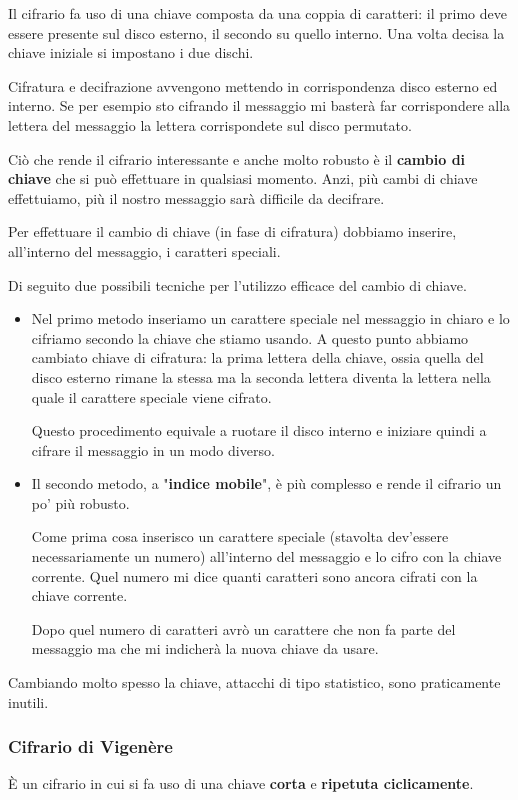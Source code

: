 Il cifrario fa uso di una chiave composta da una coppia di caratteri: il primo deve essere presente sul disco esterno, il
secondo su quello interno. Una volta decisa la chiave iniziale si impostano i due dischi.

Cifratura e decifrazione avvengono mettendo in corrispondenza disco esterno ed interno. Se per esempio sto cifrando il
messaggio mi baster\`a far corrispondere alla lettera del messaggio la lettera corrispondete sul disco permutato.

Ci\`o che rende il cifrario interessante e anche molto robusto \`e il \textbf{cambio di chiave} che si pu\`o effettuare
in qualsiasi momento. Anzi, pi\`u cambi di chiave effettuiamo, pi\`u il nostro messaggio sar\`a difficile da decifrare.

Per effettuare il cambio di chiave (in fase di cifratura) dobbiamo inserire, all'interno del messaggio, i caratteri speciali.

Di seguito due possibili tecniche per l'utilizzo efficace del cambio di chiave.
\begin{itemize}
	\item Nel primo metodo inseriamo un carattere speciale nel messaggio in chiaro e lo cifriamo secondo la chiave che stiamo
	      usando. A questo punto abbiamo cambiato chiave di cifratura: la prima lettera della chiave, ossia quella del disco
	      esterno rimane la stessa ma la seconda lettera diventa la lettera nella quale il carattere speciale viene cifrato.

	      Questo procedimento equivale a ruotare il disco interno e iniziare quindi a cifrare il messaggio in un modo diverso.
	\item Il secondo metodo, a "\textbf{indice mobile}", \`e pi\`u complesso e rende il cifrario un po' pi\`u robusto.

	      Come prima cosa inserisco un carattere speciale (stavolta dev'essere necessariamente un numero) all'interno del
	      messaggio e lo cifro con la chiave corrente. Quel numero mi dice quanti caratteri sono ancora cifrati con la chiave
	      corrente.

	      Dopo quel numero di caratteri avr\`o un carattere che non fa parte del messaggio ma che mi indicher\`a la nuova
	      chiave da usare.
\end{itemize}
Cambiando molto spesso la chiave, attacchi di tipo statistico, sono praticamente inutili.

\subsubsection{Cifrario di Vigen\`ere}
\`E un cifrario in cui si fa uso di una chiave \textbf{corta} e \textbf{ripetuta ciclicamente}.

